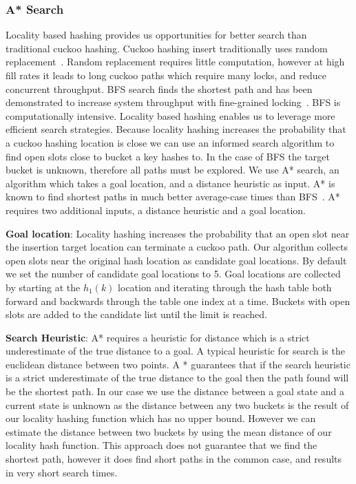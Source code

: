 \subsubsection{A* Search} 

Locality based hashing provides us opportunities for better
search than traditional cuckoo hashing. Cuckoo hashing
insert traditionally uses random replacement~\cite{cuckoo}.
Random replacement requires little computation, however at
high fill rates it leads to long cuckoo paths which require
many locks, and reduce concurrent throughput. BFS search
finds the shortest path and has been demonstrated to
increase system throughput with fine-grained
locking~\cite{cuckoo-improvements}.  BFS is computationally
intensive. Locality based hashing enables us to leverage
more efficient search strategies. Because locality hashing
increases the probability that a cuckoo hashing location is
close we can use an informed search algorithm to find open
slots close to bucket a key hashes to. 
In the case of BFS the target bucket is unknown, therefore
all paths must be explored. We use A* search, an algorithm
which takes a goal location, and a distance heuristic as
input. A* is known to find shortest paths in much better
average-case times than BFS~\cite{}. A* requires two
additional inputs, a distance heuristic and a goal location.

\textbf{Goal location}: Locality hashing increases the
probability that an open slot near the insertion target
location can terminate a cuckoo path. Our algorithm collects
open slots near the original hash location as candidate goal
locations. By default we set the number of candidate goal
locations to 5. Goal locations are collected by starting at
the $h_1(k)$ location and iterating through the hash
table both forward and backwards through the table one index
at a time. Buckets with open slots are added to the
candidate list until the limit is reached. 


\textbf{Search Heuristic}: A* requires a heuristic for
distance which is a strict underestimate of the true
distance to a goal. A typical heuristic for search is the
euclidean distance between two points. A * guarantees that
if the search heuristic is a strict underestimate of the
true distance to the goal then the path found will be the
shortest path. In our case we use the distance between a
goal state and a current state is unknown as the distance
between any two buckets is the result of our locality
hashing function which has no upper bound. However we can
estimate the distance between two buckets by using the mean
distance of our locality hash function. This approach does
not guarantee that we find the shortest path, however it
does find short paths in the common case, and results in
very short search times.

